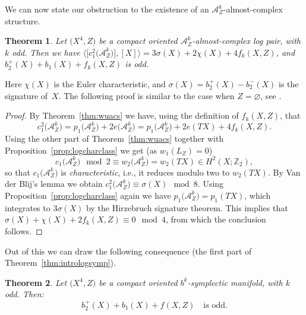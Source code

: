 \documentclass[pdftex]{sigma}
\numberwithin{equation}{section}
\newtheorem{Theorem}{Theorem}[section]
\begin{document}
We can now state our obstruction to the existence of an $\mathcal{A}^k_Z$-almost-complex structure.

\begin{Theorem}\label{thm:azalmostcplx} Let $\big(X^4,Z\big)$ be a compact oriented $\mathcal{A}^k_Z$-almost-complex log pair, with $k$ odd. Then we have $\big\langle \big[c_1^2\big(\mathcal{A}^k_Z\big)\big], [X] \big\rangle = 3 \sigma(X) + 2 \chi(X) + 4 f_k(X,Z)$, and $b_2^+(X) + b_1(X) + f_k(X,Z)$ is odd.
\end{Theorem}

Here $\chi(X)$ is the Euler characteristic, and $\sigma(X) = b_2^+(X) - b_2^-(X)$ is the signature of~$X$.
The following proof is similar to the case when $Z = \varnothing$, see \cite[Theorem~1.4.13]{GompfStipsicz99}.

\begin{proof} By Theorem~\ref{thm:wuacs} we have, using the definition of $f_k(X,Z)$, that
\begin{displaymath}
	c_1^2\big(\mathcal{A}_Z^k\big) = p_1\big(\mathcal{A}_Z^k\big) + 2 e\big(\mathcal{A}_Z^k\big) = p_1\big(\mathcal{A}_Z^k\big) + 2 e(TX) + 4 f_k(X,Z).
\end{displaymath}
Using the other part of Theorem~\ref{thm:wuacs} together with Proposition~\ref{prop:logcharclass} we get (as $w_1(L_Z) = 0$)
\begin{displaymath}
	c_1\big(\mathcal{A}_Z^k\big) \!\!\!\!\mod 2 \equiv w_2\big(\mathcal{A}_Z^k\big) = w_2(TX) \in H^2(X;\mathbb{Z}_2),
\end{displaymath}
so that $c_1\big(\mathcal{A}_Z^k\big)$ is \emph{characteristic}, i.e., it reduces modulo two to $w_2(TX)$. By Van der Blij's lemma \cite[Lemma~1.2.20]{GompfStipsicz99} we obtain $c_1^2\big(\mathcal{A}_Z^k\big) \equiv \sigma(X) \!\!\mod 8$. Using Proposition~\ref{prop:logcharclass} again we have $p_1\big(\mathcal{A}_Z^k\big) = p_1(TX)$, which integrates to $3 \sigma(X)$ by the Hirzebruch signature theorem. This implies that $\sigma(X) + \chi(X) + 2 f_k(X,Z) \equiv 0 \!\!\mod 4$, from which the conclusion follows.
\end{proof}

Out of this we can draw the following consequence (the first part of Theorem~\ref{thm:intrologsymp}).

\begin{Theorem}\label{thm:azsympstr} Let $\big(X^4,Z\big)$ be a compact oriented $b^k$-symplectic manifold, with $k$ odd. Then:
	\begin{displaymath}
		b_2^+(X) + b_1(X) + f(X,Z) \quad \text{is odd}.
	\end{displaymath}
\end{Theorem}
\end{document}
